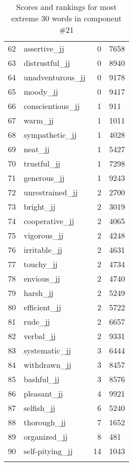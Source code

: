 \begin{longtable}[!htbp]{| rlr@{.}l |}
    62 & assertive\_jj & 0 & 7658 \\
    63 & distrustful\_jj & 0 & 8940 \\
    64 & unadventurous\_jj & 0 & 9178 \\
    65 & moody\_jj & 0 & 9417 \\
    66 & conscientious\_jj & 1 & 911 \\
    67 & warm\_jj & 1 & 1011 \\
    68 & sympathetic\_jj & 1 & 4028 \\
    69 & neat\_jj & 1 & 5427 \\
    70 & trustful\_jj & 1 & 7298 \\
    71 & generous\_jj & 1 & 9243 \\
    72 & unrestrained\_jj & 2 & 2700 \\
    73 & bright\_jj & 2 & 3019 \\
    74 & cooperative\_jj & 2 & 4065 \\
    75 & vigorous\_jj & 2 & 4248 \\
    76 & irritable\_jj & 2 & 4631 \\
    77 & touchy\_jj & 2 & 4734 \\
    78 & envious\_jj & 2 & 4740 \\
    79 & harsh\_jj & 2 & 5249 \\
    80 & efficient\_jj & 2 & 5722 \\
    81 & rude\_jj & 2 & 6657 \\
    82 & verbal\_jj & 2 & 9331 \\
    83 & systematic\_jj & 3 & 6444 \\
    84 & withdrawn\_jj & 3 & 8457 \\
    85 & bashful\_jj & 3 & 8576 \\
    86 & pleasant\_jj & 4 & 9921 \\
    87 & selfish\_jj & 6 & 5240 \\
    88 & thorough\_jj & 7 & 1652 \\
    89 & organized\_jj & 8 & 481 \\
    90 & self-pitying\_jj & 14 & 1043 \\
    \hline
    \caption{Scores and rankings for most extreme 30 words in component \#21} \\
\end{longtable}
